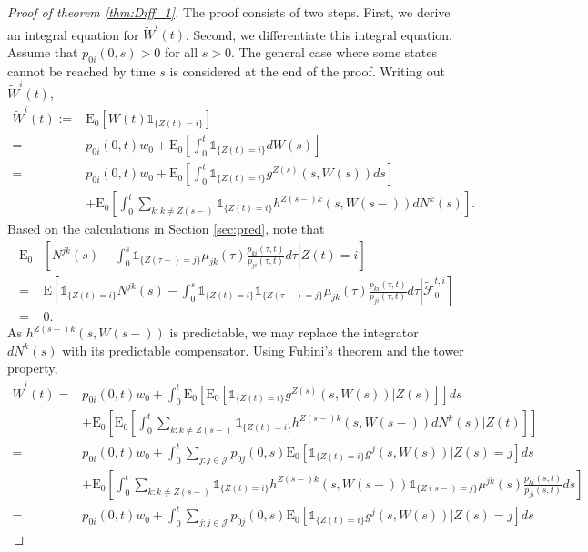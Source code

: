 \documentclass[12pt]{article}
\newcommand{\E}{\text{E}}
\newcommand{\indic}[1]{\mathds{1}_{ \{ #1 \} }}
\theoremstyle{my_thm}
\begin{document}
\begin{proof}[Proof of theorem \ref{thm:Diff_1}]
The proof consists of two steps. First, we derive an integral equation for $\tilde{W}^i(t)$. Second, we differentiate this integral equation. \\
Assume that $p_{0i}(0,s)>0$ for all $s>0$. The general case where some states cannot be reached by time $s$ is considered at the end of the proof. Writing out $\tilde{W}^i(t)$,
\begin{align*}
\tilde{W}^i(t):=&\E_0[W(t) \indic{Z(t)=i}]
\\
=&
p_{0i}(0,t)w_0+\E_0 \left[ \int_0^t \indic{Z(t)=i} dW(s) \right]
\\
=&
p_{0i}(0,t)w_0+\E_0 \left[ \int_0^t \indic{Z(t)=i} g^{Z(s)}(s,W(s))ds \right]
\\
&+
\E_0 \left[ \int_0^t \sum_{k:k \neq Z(s-)} \indic{Z(t)=i} h^{Z(s-)k}(s,W(s-)) dN^k(s)  \right].
\end{align*}
Based on the calculations in Section \ref{sec:pred}, note that 
\begin{align*}
\E_0 & \left. \left[ N^{jk}(s) - \int_0^s \indic{Z(\tau-)=j} \mu_{jk}(\tau)\frac{p_{ki}(\tau,t)}{p_{ji}(\tau,t)} d\tau \right| Z(t)=i \right] 
\\
=&
\E \left. \left[ \indic{Z(t)=i}N^{jk}(s) - \int_0^s \indic{Z(t)=i} \indic{Z(\tau-)=j} \mu_{jk}(\tau)\frac{p_{ki}(\tau,t)}{p_{ji}(\tau,t)} d\tau \right| \tilde{\mathcal{F}}_0^{t,i} \right]  
\\
=& 0.
\end{align*}
As $h^{Z(s-)k}(s,W(s-))$ is predictable, we may replace the integrator $dN^k(s)$ with its predictable compensator. Using Fubini's theorem and the tower property,
\begin{align}
\tilde{W}^i(t)=& p_{0i}(0,t)w_0+
\nonumber \int_0^t \E_0 \left[ \E_0 \left[ \indic{Z(t)=i} g^{Z(s)}(s,W(s))|Z(s) \right]\right] ds
\\
&+
\nonumber \E_0 \left[ \E_0 \left[ \int_0^t \sum_{k:k \neq Z(s-)}\indic{Z(t)=i} h^{Z(s-)k}(s,W(s-)) dN^k(s) |Z(t) \right] \right] 
\\
=&
 p_{0i}(0,t)w_0+
\nonumber \int_0^t \sum_{j:j \in \mathcal{J}} p_{0j}(0,s) \E_0 \left[ \indic{Z(t)=i} g^{j}(s,W(s))|Z(s)=j \right]  ds
\\
&+
\nonumber \E_0 \left[ \int_0^t \sum_{k:k \neq Z(s-)}\indic{Z(t)=i} h^{Z(s-)k}(s,W(s-)) \indic{Z(s-)=j} \mu^{jk}(s) \frac{p_{ki}(s,t)}{p_{ji}(s,t)}ds \right] 
\\
=&
p_{0i}(0,t)w_0+
\nonumber \int_0^t \sum_{j:j \in \mathcal{J}} p_{0j}(0,s) \E_0 \left[ \indic{Z(t)=i} g^{j}(s,W(s))|Z(s)=j \right] ds

\end{align}
\end{proof}
\end{document}
